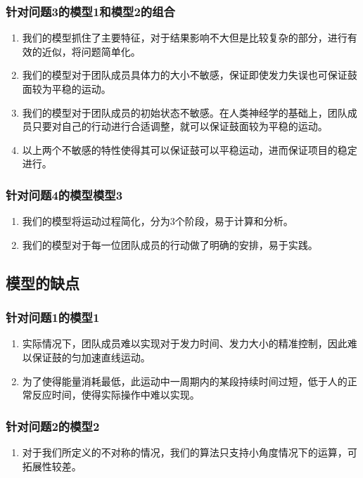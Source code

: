 \documentclass[nocover]{cumcmart}%
\begin{document}
\subsubsection{针对问题3的模型1和模型2的组合}
\begin{enumerate}[(1)]
\item
我们的模型抓住了主要特征，对于结果影响不大但是比较复杂的部分，进行有效的近似，将问题简单化。
\item
我们的模型对于团队成员具体力的大小不敏感，保证即使发力失误也可保证鼓面较为平稳的运动。
\item
我们的模型对于团队成员的初始状态不敏感。在人类神经学的基础上，团队成员只要对自己的行动进行合适调整，就可以保证鼓面较为平稳的运动。

\item
以上两个不敏感的特性使得其可以保证鼓可以平稳运动，进而保证项目的稳定进行。

\end{enumerate}
\subsubsection{针对问题4的模型模型3}
\begin{enumerate}[(1)]
\item
我们的模型将运动过程简化，分为3个阶段，易于计算和分析。
\item
我们的模型对于每一位团队成员的行动做了明确的安排，易于实践。

\end{enumerate}
\subsection{模型的缺点}
\subsubsection{针对问题1的模型1}
\begin{enumerate}[(1)]
    \item 
实际情况下，团队成员难以实现对于发力时间、发力大小的精准控制，因此难以保证鼓的匀加速直线运动。
\item
为了使得能量消耗最低，此运动中一周期内的某段持续时间过短，低于人的正常反应时间，使得实际操作中难以实现。

\end{enumerate}
\subsubsection{针对问题2的模型2}
\begin{enumerate}[(1)]
    \item 
对于我们所定义的不对称的情况，我们的算法只支持小角度情况下的运算，可拓展性较差。

\end{enumerate}
\end{document}
